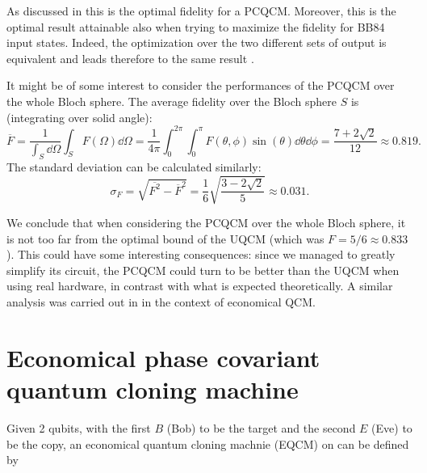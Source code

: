 As discussed in \cite{PhaseCovariantOptimalBruss} this is the optimal fidelity for a PCQCM. 
Moreover, this is the optimal result attainable also when trying to maximize the fidelity for BB84 input states.
Indeed, the optimization over the two different sets of output is equivalent and leads therefore to the same result \cite{PhaseCovariantOptimalBruss}.

It might be of some interest to consider the performances of the PCQCM over the whole Bloch sphere.
The average fidelity over the Bloch sphere $S$ is (integrating over solid angle):
\[
    \overline{F}=\frac{1}{\int_S \dd{\Omega}}\int_S F(\Omega)\dd{\Omega}=\frac{1}{4\pi}\int_0^{2\pi}\int_0^\pi F(\theta,\phi)\sin(\theta)\dd{\theta}\dd{\phi}=\frac{7+2\sqrt{2}}{12}\approx 0.819.
\]
The standard deviation can be calculated similarly:
\[
    \sigma_{F}=\sqrt{\overline{F^2}-\overline{F}^2}=\frac{1}{6}\sqrt{\frac{3-2\sqrt{2}}{5}}\approx0.031.
\]

We conclude that when considering the PCQCM over the whole Bloch sphere, it is not too far from the optimal bound of the UQCM (which was $F=5/6\approx 0.833$).
This could have some interesting consequences: since we managed to greatly simplify its circuit, the PCQCM could turn to be better than the UQCM when using real hardware, in contrast with what is expected theoretically.
A similar analysis was carried out in \cite{LowCostCloning} in the context of economical QCM.
\section{Economical phase covariant quantum cloning machine}

Given 2 qubits, with the first $B$ (Bob) to be the target and the second $E$ (Eve) to be the copy, an economical quantum cloning machnie 
(EQCM) on can be defined by 

